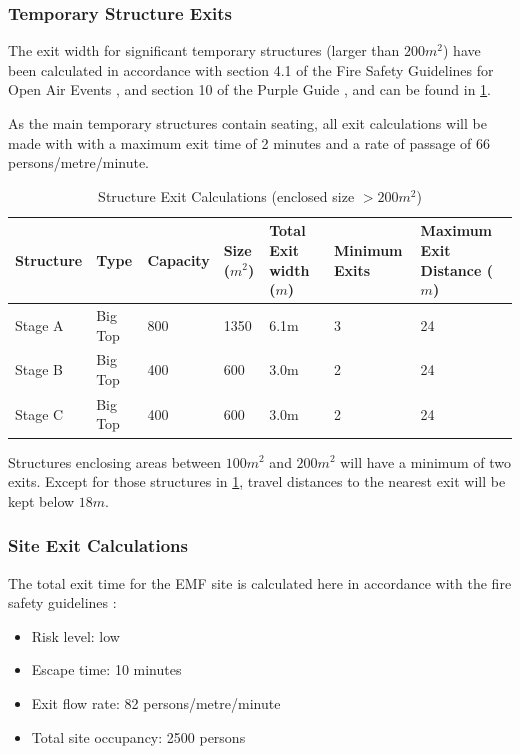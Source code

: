 \subsubsection{Temporary Structure Exits}

The exit width for significant temporary structures (larger than $200m^2$) have been calculated
in accordance with section 4.1 of the Fire Safety Guidelines for Open Air Events \cite{firesafety},
and section 10 of the Purple Guide \cite{purpleguide}, and can be found in \cref{table:exit}.

As the main temporary structures contain seating, all exit calculations will be made with
with a maximum exit time of 2 minutes and a rate of passage of 66 persons/metre/minute. 

\begin{table}[h!]
    \caption{Structure Exit Calculations (enclosed size $>200m^2$)}
    \label{table:exit}
\centering
\begin{tabular}{| l | l | l | l | p{1.5cm} | l | p{2.5cm} |}
\hline
    \textbf{Structure} & \textbf{Type} & \textbf{Capacity} & \textbf{Size ($m^2$)} &
    \textbf{Total Exit width ($m$)} & \textbf{Minimum Exits} & \textbf{Maximum Exit Distance ($m$)} \\ \hline
    Stage A  & Big Top & 800  & 1350  & 6.1m & 3 & 24  \\
    Stage B  & Big Top & 400  & 600   & 3.0m & 2 & 24  \\
    Stage C  & Big Top & 400  & 600   & 3.0m & 2 & 24  \\
\hline
\end{tabular}
\end{table}

Structures enclosing areas between $100m^2$ and $200m^2$ will have a minimum of two exits. Except
for those structures in \cref{table:exit}, travel distances to the nearest exit will be kept below $18m$.

\subsubsection{Site Exit Calculations}
The total exit time for the EMF site is calculated here in accordance with the fire safety
guidelines \cite{firesafety}:

\begin{itemize}
\tightlist
\item Risk level: low
\item Escape time: 10 minutes
\item Exit flow rate: 82 persons/metre/minute
\item Total site occupancy: 2500 persons
\end{itemize}

